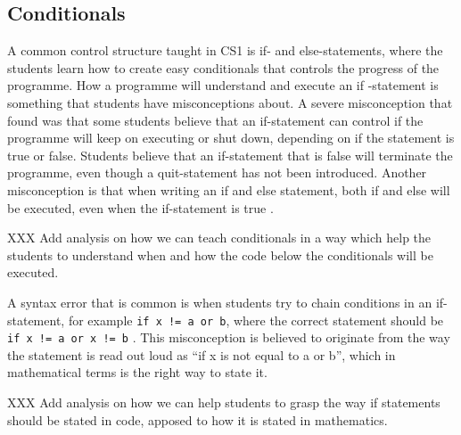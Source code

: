 \subsection{Conditionals}

A common control structure taught in CS1 is if- and else-statements, where 
the students learn how to create easy conditionals that controls the 
progress of the programme. How a programme will understand and execute an if
-statement is something that students have misconceptions about. A severe 
misconception that \textcite{Plass2015Variables} found was that some 
students believe that an if-statement can control if the programme will 
keep on executing or shut down, depending on if the statement is true or 
false. Students believe that an if-statement that is false will terminate 
the programme, even though a quit-statement has not been introduced. 
Another misconception is that when writing an if and else statement, both 
if and else will be executed, even when the if-statement is true \parencite{
MisconceptionsSurvey2017}.

XXX Add analysis on how we can teach conditionals in a way which help the 
students to understand when and how the code below the conditionals will be 
executed.

A syntax error that is common is when students try to chain conditions in 
an if-statement, for example \texttt{if x != a or b}, where the 
correct statement should be \texttt{if x != a or x != b} 
\parencite{GuoMarkelZhang2020}. This misconception is believed to originate 
from the way the statement is read out loud as \enquote{if x is not equal to a 
or b}, which in mathematical terms is the right way to state it. 

XXX Add analysis on how we can help students to grasp the way if statements 
should be stated in code, apposed to how it is stated in mathematics. 
